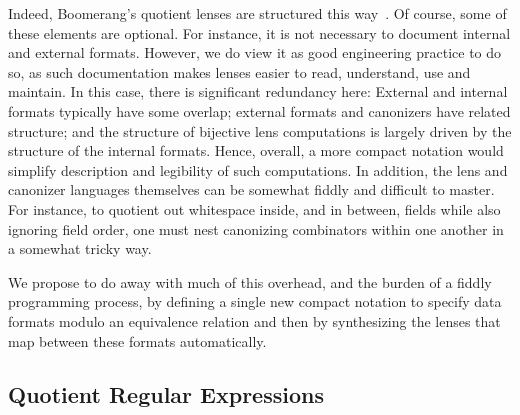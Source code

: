 \documentclass[acmsmall,review,anonymous]{acmart}
\newcommand{\bibtex}{\textsc{Bib}\TeX{}}
\begin{document}
\noindent
Indeed, Boomerang's quotient lenses are structured this
way~\cite{quotientlenses}.
Of course, some of these elements are optional.  For instance, it is
not necessary to document internal and external formats.  However, we do
view it as good engineering practice to do so, as such documentation makes
lenses easier to read, understand, use and maintain.  In this case, there is
significant redundancy here:  External and internal formats
typically have some overlap; external formats and canonizers have related
structure; and the structure of bijective lens computations is largely driven
by the structure of the internal formats.  Hence, overall, a more compact
notation would simplify description and legibility of such computations.
In addition,
the lens and canonizer languages themselves can be somewhat fiddly and
difficult to
master.  For instance, to quotient out whitespace inside, and in between,
fields while also ignoring field order, one must nest canonizing combinators
within one another in a somewhat tricky way.


We propose to do away with much of this overhead, and the burden of a
fiddly programming process, by defining a single new compact notation
to specify data formats modulo an equivalence relation and then by
synthesizing the lenses that map between these formats automatically.

\subsection{Quotient Regular Expressions}
\end{document}
